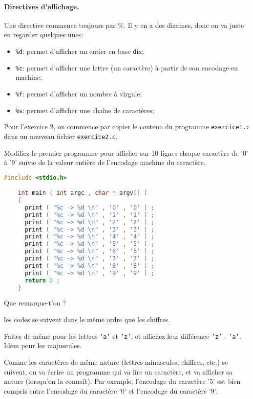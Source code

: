 \paragraph{Directives d'affichage.} Une directive commence toujours
par \%. Il y en a des dizaines, donc on va juste en regarder quelques unes:
\begin{itemize}
\item \texttt{\%d}: permet d'afficher un entier en base \texttt{d}ix;
\item \texttt{\%c}: permet d'afficher une lettre (un caractère) à partir de son encodage en machine;
\item \texttt{\%f}: permet d'afficher un nombre à virgule;
\item \texttt{\%s}: permet d'afficher une chaîne de caractères;
\end{itemize}
Pour l'exercice 2, on commence par copier le contenu du programme
\texttt{exercice1.c} dans un nouveau fichier \texttt{exercice2.c}.


\question Modifiez le premier programme pour afficher sur 10 lignes
chaque caractère de '0' à '9' suivie de la valeur entière de l'encodage machine du caractère.
\begin{solution}
  \begin{lstlisting}[language=C]
    #include <stdio.h>

    int main ( int argc , char * argv[] ) 
    {
      print ( "%c -> %d \n" , '0' , '0' ) ;
      print ( "%c -> %d \n" , '1' , '1' ) ;
      print ( "%c -> %d \n" , '2' , '2' ) ;
      print ( "%c -> %d \n" , '3' , '3' ) ;
      print ( "%c -> %d \n" , '4' , '4' ) ;
      print ( "%c -> %d \n" , '5' , '5' ) ;
      print ( "%c -> %d \n" , '6' , '6' ) ;
      print ( "%c -> %d \n" , '7' , '7' ) ;
      print ( "%c -> %d \n" , '8' , '8' ) ;
      print ( "%c -> %d \n" , '9' , '9' ) ;
      return 0 ; 
    }
  \end{lstlisting}
\end{solution}
Que remarque-t'on ?

\begin{solution}
  les codes se suivent dans le même ordre que les chiffres.
\end{solution}

\question Faites de même pour les lettres \texttt{'a'} et \texttt{'z'}, et affichez leur
différence \texttt{'z'} - \texttt{'a'}. Idem pour les majuscules.

\prerequis{}
Comme les caractères de même nature (lettres minuscules, chiffres, etc.)
se suivent, on va écrire un programme qui va lire un caractère, et va
afficher sa nature (lorsqu'on la connaît). Par exemple, 
l'encodage du caractère '5' est bien compris entre l'encodage du caractère '0'
et l'encodage du caractère '9'.

